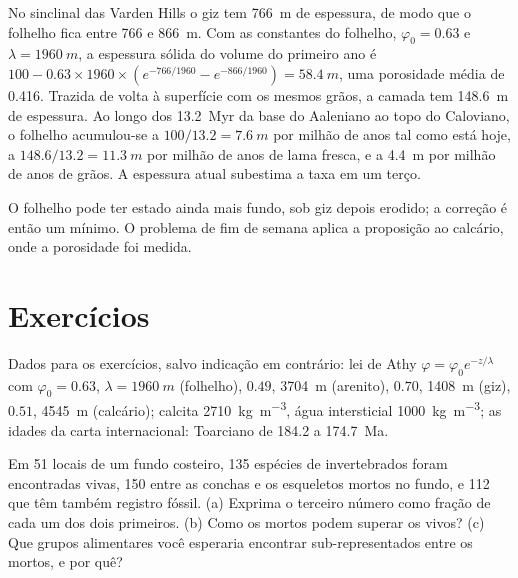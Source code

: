 \begin{example}\label{ex:b2:palaeoenvironments:shale}
No sinclinal das Varden Hills o giz tem \qty{766}{m} de espessura, de modo que o folhelho fica entre
766 e \qty{866}{m}. Com as constantes do folhelho, $\varphi_0 = 0.63$ e $\lambda =
\qty{1960}{m}$, a espessura sólida do volume do primeiro ano é $100 - 0.63 \times 1960 \times
(e^{-766/1960} - e^{-866/1960}) = \qty{58.4}{m}$, uma porosidade média de 0.416. Trazida de volta à
superfície com os mesmos grãos, a camada tem \qty{148.6}{m} de espessura. Ao longo dos \qty{13.2}{Myr} da
base do Aaleniano ao topo do Caloviano, o folhelho acumulou-se a $100/13.2 =
\qty{7.6}{m}$ por milhão de anos tal como está hoje, a $148.6/13.2 = \qty{11.3}{m}$ por milhão de
anos de lama fresca, e a \qty{4.4}{m} por milhão de anos de grãos. A espessura atual
subestima a taxa em um terço.
\end{example}

O folhelho pode ter estado ainda mais fundo, sob giz depois erodido; a correção é então um
mínimo. O problema de fim de semana aplica a proposição ao calcário, onde a porosidade foi
medida.

\section*{Exercícios}\label{sec:b2:palaeoenvironments:exercises}

Dados para os exercícios, salvo indicação em contrário: lei de Athy $\varphi = \varphi_0 e^{-z/\lambda}$
com $\varphi_0 = 0.63$, $\lambda = \qty{1960}{m}$ (folhelho), $0.49$, \qty{3704}{m} (arenito),
$0.70$, \qty{1408}{m} (giz), $0.51$, \qty{4545}{m} (calcário); calcita \qty{2710}{kg.m^{-3}},
água intersticial \qty{1000}{kg.m^{-3}}; as idades da carta internacional: Toarciano de 184.2 a
\qty{174.7}{Ma}.

\begin{exercise}[$\star$]\label{exo:b2:palaeoenvironments:1}
Em 51 locais de um fundo costeiro, 135 espécies de invertebrados foram encontradas vivas, 150 entre as conchas
e os esqueletos mortos no fundo, e 112 que têm também registro fóssil. (a) Exprima o terceiro
número como fração de cada um dos dois primeiros. (b) Como os mortos podem superar os vivos? (c)
Que grupos alimentares você esperaria encontrar sub-representados entre os mortos, e por quê?
\end{exercise}

